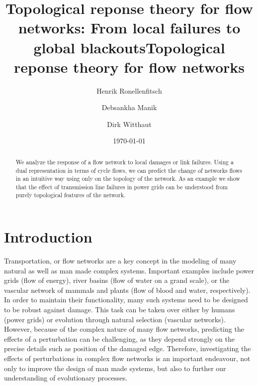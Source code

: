 \documentclass[10pt,aps,pra,twocolumn,superscriptaddress]{revtex4-1}
\begin{document}

\title{Topological reponse theory for flow networks: From local failures to global blackouts}
\title{Topological reponse theory for flow networks}

\author{Henrik Ronellenfitsch}
\author{Debsankha Manik}
 
\author{Dirk Witthaut}

\date{\today }


\begin{abstract}
We analyze the response of a flow network to local damages or link failures. Using a dual representation in terms of cycle flows, we can predict the change of networks flows in an intuitive way using only on the topology of the network. As an example we show that the effect of transmission line failures in power grids can be understood from purely topological features of the network. 
\end{abstract}


\maketitle


\section{Introduction}
Transportation, or flow networks are a key concept in the modeling
of many natural as well as man made complex systems. Important
examples include power grids (flow of energy), river basins (flow
of water on a grand scale), or the vascular network of mammals
and plants (flow of blood and water, respectively).
In order to maintain their functionality, many such systems need
to be designed to be robust against damage. This task can be taken
over either by humans (power grids) or evolution through natural
selection (vascular networks).
However, because of the complex nature of many flow networks,
predicting the effects of a perturbation can be challenging, as they
depend strongly on the precise details such as position of the damaged
edge.
Therefore, investigating the effects of perturbations in complex flow
networks is an important endeavour, not only to improve the design
of man made systems, but also to further our understanding of
evolutionary processes.
\end{document}
